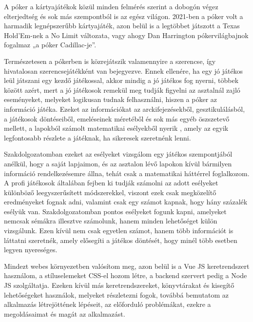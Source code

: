 
A póker a kártyajátékok közül minden felmérés szerint a dobogón végez elterjedtség és sok más szempontból is az egész világon. 2021-ben a póker volt a harmadik legnépszerűbb kártyajáték, azon belül is a legtöbbet játszott a Texas Hold’Em-nek a No Limit változata, vagy ahogy Dan Harrington pókervilágbajnok fogalmaz „a póker Cadillac-je”. 

Természetesen a pókerben is közrejátszik valamennyire a szerencse, így hivatalosan szerencsejátékként van bejegyezve. Ennek ellenére, ha egy jó játékos leül játszani egy kezdő játékossal, akkor mindig a jó játékos fog nyerni, többek között azért, mert a jó játékosok remekül meg tudják figyelni az asztalnál zajló eseményeket, melyeket logikusan tudnak felhasználni, hiszen a póker az információ játéka. Ezeket az információkat az arckifejezésekből, gesztikulálásból, a játékosok döntéseiből, emeléseinek méretéből és sok más egyéb öszszetevő mellett, a lapokból számolt matematikai esélyekből nyerik , amely az egyik legfontosabb részlete a játéknak, ha sikeresek szeretnénk lenni.

Szakdolgozatomban ezeket az esélyeket vizsgálom egy játékos szempontjából anélkül, hogy a saját lapjaimon, és az asztalon lévő lapokon kívül bármilyen információ rendelkezésemre állna, tehát csak a matematikai háttérrel foglalkozom. A profi játékosok általában fejben ki tudják számolni az adott esélyeket különböző leegyszerűsített módszerekkel, viszont ezek csak megközelítő eredményeket fognak adni, valamint csak egy számot kapnak, hogy hány százalék esélyük van. Szakdolgozatomban pontos esélyeket fogunk kapni, amelyeket nemcsak sémákra illesztve számolunk, hanem minden lehetőséget külön vizsgálunk. Ezen kívül nem csak egyetlen számot, hanem több információt is láttatni szeretnék, amely elősegíti a játékos döntését, hogy minél több esetben legyen nyereséges.

Mindezt webes környezetben valósítom meg, azon belül is a Vue JS keretrendszert használom, a stíluselemeket CSS-el hozom létre, a backend szervert pedig a Node JS szolgáltatja. Ezeken kívül más keretrendszereket, könyvtárakat és kisegítő lehetőségeket használok, melyeket részletezni fogok, továbbá bemutatom az alkalmazás létrejöttének lépéseit, az előforduló problémákat, ezekre a megoldásaimat és magát az alkalmazást.
\cite{harrington}
